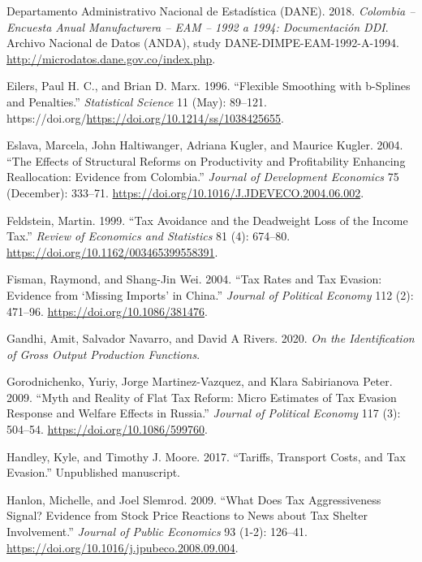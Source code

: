 \documentclass[
  12pt,
  letterpaper,
  oneside,
  openany]{report}
\newlength{\cslhangindent}
\newenvironment{CSLReferences}[2] %
 {\begin{list}{}{%
  \setlength{\itemindent}{0pt}
  \setlength{\leftmargin}{0pt}
  \setlength{\parsep}{0pt}
  \ifodd #1
   \setlength{\leftmargin}{\cslhangindent}
   \setlength{\itemindent}{-1\cslhangindent}
  \fi
  \setlength{\itemsep}{#2\baselineskip}}}
 {\end{list}}
\begin{document}
\begin{CSLReferences}{1}{1}
Departamento Administrativo Nacional de Estadística (DANE). 2018.
\emph{Colombia -- Encuesta Anual Manufacturera -- {EAM} -- 1992 a 1994:
Documentaci{ó}n {DDI}}. Archivo Nacional de Datos (ANDA), study
DANE-DIMPE-EAM-1992-A-1994.
\url{http://microdatos.dane.gov.co/index.php}.

Eilers, Paul H. C., and Brian D. Marx. 1996. {``Flexible Smoothing with
b-Splines and Penalties.''} \emph{Statistical Science} 11 (May):
89--121. https://doi.org/\url{https://doi.org/10.1214/ss/1038425655}.

Eslava, Marcela, John Haltiwanger, Adriana Kugler, and Maurice Kugler.
2004. {``The Effects of Structural Reforms on Productivity and
Profitability Enhancing Reallocation: Evidence from Colombia.''}
\emph{Journal of Development Economics} 75 (December): 333--71.
\url{https://doi.org/10.1016/J.JDEVECO.2004.06.002}.

Feldstein, Martin. 1999. {``Tax Avoidance and the Deadweight Loss of the
Income Tax.''} \emph{Review of Economics and Statistics} 81 (4):
674--80. \url{https://doi.org/10.1162/003465399558391}.

Fisman, Raymond, and Shang-Jin Wei. 2004. {``Tax Rates and Tax Evasion:
Evidence from {`Missing Imports'} in {China}.''} \emph{Journal of
Political Economy} 112 (2): 471--96.
\url{https://doi.org/10.1086/381476}.

Gandhi, Amit, Salvador Navarro, and David A Rivers. 2020. \emph{On the
Identification of Gross Output Production Functions}.

Gorodnichenko, Yuriy, Jorge Martinez-Vazquez, and Klara Sabirianova
Peter. 2009. {``Myth and Reality of Flat Tax Reform: Micro Estimates of
Tax Evasion Response and Welfare Effects in {Russia}.''} \emph{Journal
of Political Economy} 117 (3): 504--54.
\url{https://doi.org/10.1086/599760}.

Handley, Kyle, and Timothy J. Moore. 2017. {``Tariffs, Transport Costs,
and Tax Evasion.''} Unpublished manuscript.

Hanlon, Michelle, and Joel Slemrod. 2009. {``What Does Tax
Aggressiveness Signal? Evidence from Stock Price Reactions to News about
Tax Shelter Involvement.''} \emph{Journal of Public Economics} 93 (1-2):
126--41. \url{https://doi.org/10.1016/j.jpubeco.2008.09.004}.


\end{CSLReferences}
\end{document}
